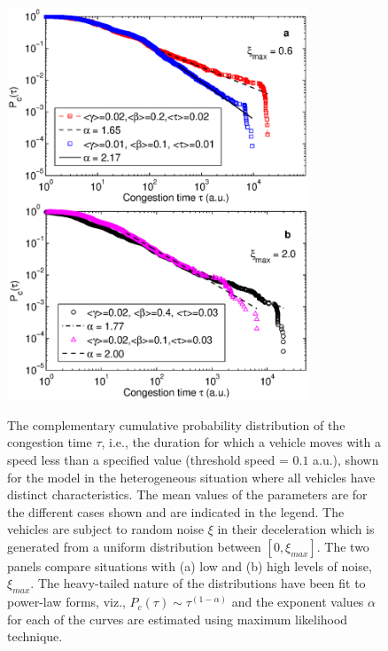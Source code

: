 \documentclass[conference]{IEEEtran}
\begin{document}
\begin{figure}
{    \includegraphics[width=9.0cm, angle=0]{figures/fig6.eps}}
\caption{The complementary cumulative probability distribution of the
congestion time $\tau$, i.e., the duration for which a vehicle moves
with a speed less than a specified value (threshold speed = $0.1$
a.u.),
shown for the model in the heterogeneous situation where all
vehicles have distinct characteristics. The mean values of the
parameters are for the different cases shown and are indicated in the
legend. The vehicles are subject to random noise $\xi$ in their deceleration
which is generated from a uniform distribution between $[0,
\xi_{max}]$. The two panels compare situations with (a) low and (b) high
levels of noise, $\xi_{max}$. The heavy-tailed nature of the
distributions have been fit to power-law forms, viz., 
$P_c(\tau) \sim
\tau^{(1-\alpha)}$
and 
the exponent values $\alpha$ for each of the curves are estimated 
using maximum likelihood technique.}
    \label{power_law_abt}
\end{figure}
\end{document}
